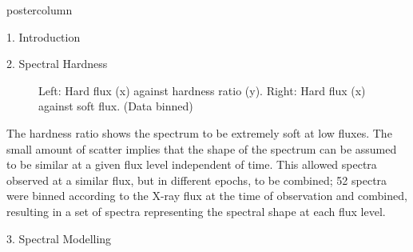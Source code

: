 \documentclass[final]{beamer}
\begin{document}
\begin{frame}
\begin{columns}
\begin{column}{.5\textwidth}
\begin{beamercolorbox}[center,wd=\textwidth]{postercolumn}
\begin{minipage}[T]{.98\textwidth}
{\begin{block}{1. Introduction}
            \end{block}

            \vfill
            
	    \vspace{-120pt}
	    

            \begin{block}{2. Spectral Hardness} 
            
		\begin{figure}
			\hspace{-10pt}
			\caption{Left: Hard flux (x) against 
			hardness ratio (y). Right: Hard flux (x) against soft flux. (Data binned)}
		\end{figure}
				
		The hardness ratio shows the spectrum to be extremely soft at low fluxes. 
		The small amount of scatter implies that the shape of the spectrum can be 
		assumed to be similar at a given flux level independent of time. This allowed spectra observed 
		at a similar flux, but in different epochs, to be combined; 52 spectra were 
		binned according to the X-ray flux at the time of observation and 
		combined, resulting in a set of spectra representing the spectral shape at each flux level.
		
		
		
			
            \end{block}

            \vfill    
	    \vspace{-120pt}  
          
	
	                


           \begin{block}{3. Spectral Modelling} 
           
           
           \begin{wrapfigure}{L}{0.65\textwidth}
	      \begin{table}[ht!]
		\label{table:second}
		\centering
		\footnotesize
		\begin{tabular}{| p{7.5cm}|| p{3cm} | p{3cm} | p{5.2cm} || p{1.5cm} | p{1.7cm}  |} \hline
		

\end{tabular}
\end{table}
\end{wrapfigure}
\end{block}}
\end{minipage}
\end{beamercolorbox}
\end{column}
\end{columns}
\end{frame}
\end{document}
